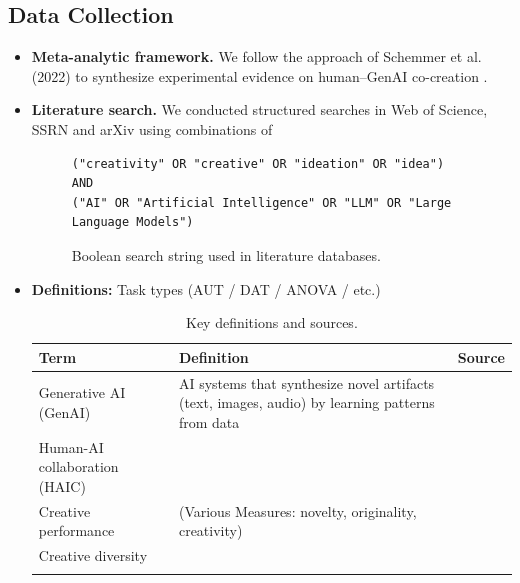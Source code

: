 \documentclass[acmsmall,authorversion]{acmart}
\begin{document}
\subsection{Data Collection}
\label{subsec:DataCollection}
\begin{itemize}
  \item \textbf{Meta-analytic framework.}  
    We follow the approach of Schemmer et al.\,(2022) to synthesize experimental evidence on human–GenAI co-creation \cite{Schemmer2022}.

  \item \textbf{Literature search.}  
    We conducted structured searches in Web of Science, SSRN and arXiv using combinations of  
\begin{figure}[ht]
  \centering
  \begin{tcolorbox}[
    enhanced,
    breakable,
    center upper, 
    colback=gray!10,
    colframe=gray!60!black,
    boxrule=0.8pt,
    arc=4pt,
    outer arc=4pt,
    drop shadow={black!50!white,opacity=0.3},
    width=\textwidth,
    title=\textbf{Database Search Query}
  ]
    \begin{verbatim}
("creativity" OR "creative" OR "ideation" OR "idea")
AND
("AI" OR "Artificial Intelligence" OR "LLM" OR "Large Language Models")
    \end{verbatim}
  \end{tcolorbox}
  \caption{Boolean search string used in literature databases.}
  \label{fig:search-query}
\end{figure}

    \item \textbf{Definitions:} Task types (AUT / DAT / ANOVA / etc.) 

\begin{table}[ht]
  \centering
  \label{tab:definitions}
  \begin{tabular}{l|p{7cm}|l}
    \toprule
    \textbf{Term} & \textbf{Definition} & \textbf{Source} \\
    \midrule
    Generative AI (GenAI) & AI systems that synthesize novel artifacts (text, images, audio) by learning patterns from data & \cite{FeuerriegelBISE2024}\\
    Human-AI collaboration (HAIC) &  & \\
    Creative performance & (Various Measures: novelty, originality, creativity) & \\
    Creative diversity &  & \\
    \addlinespace
    \bottomrule
  \end{tabular}
  \caption{Key definitions and sources.}
\end{table}


\end{itemize}
\end{document}
